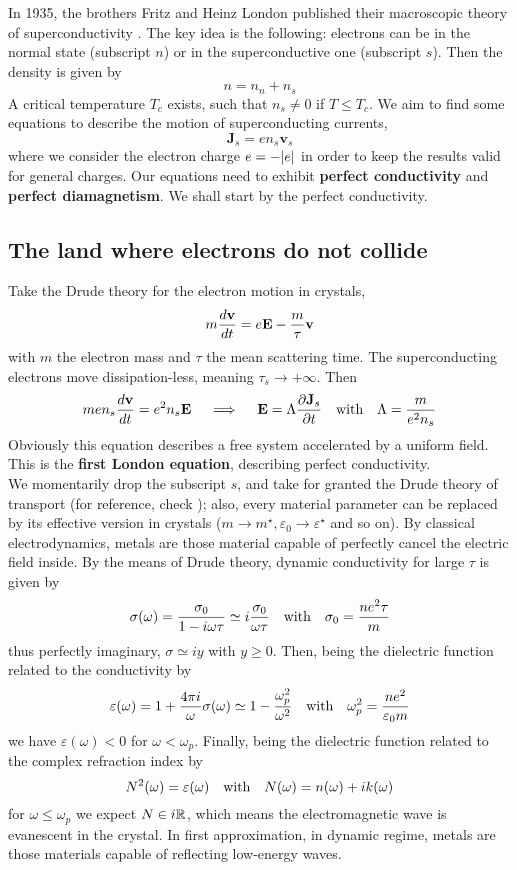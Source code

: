 In 1935, the brothers Fritz and Heinz London published their macroscopic theory of superconductivity \cite{london-superconductivity}. The key idea is the following: electrons can be in the normal state (subscript $n$) or in the superconductive one (subscript $s$). Then the density is given by
\[ n = n_n + n_s \]
A critical temperature $T_c$ exists, such that $n_s \neq 0$ if $T \le T_c$. We aim to find some equations to describe the motion of superconducting currents,
\[ \mathbf{J}_s = e n_s \mathbf{v}_s \]
where we consider the electron charge $e=-\abs{e}$ in order to keep the results valid for general charges. Our equations need to exhibit \textbf{perfect conductivity} and \textbf{perfect diamagnetism}. We shall start by the perfect conductivity.

\subsection{The land where electrons do not collide}

Take the Drude theory for the electron motion in crystals,
\[ m \dv{\mathbf{v}}{t} = e \mathbf{E} - \frac{m}{\tau} \mathbf{v} \]
with $m$ the electron mass and $\tau$ the mean scattering time. The superconducting electrons move dissipation-less, meaning $\tau_s \to +\infty$. Then
\[ m e n_s \dv{\mathbf{v}}{t} = e^2 n_s \mathbf{E} \quad\implies\quad \mathbf{E} = \Lambda \pdv{\mathbf{J}_{s}}{t} \qq{with} \Lambda = \frac{m}{e^2 n_s} \]
Obviously this equation describes a free system accelerated by a uniform field. This is the \textbf{first London equation}, describing perfect conductivity.\\

We momentarily drop the subscript $s$, and take for granted the Drude theory of transport (for reference, check \cite{grosso2000solid}); also, every material parameter can be replaced by its effective version in crystals ($m\to m^\star,\varepsilon_0\to\varepsilon^\star$ and so on). By classical electrodynamics, metals are those material capable of perfectly cancel the electric field inside. By the means of Drude theory, dynamic conductivity for large $\tau$ is given by
\[
    \sigma(\omega) = \frac{\sigma_0}{1 - i \omega\tau} \simeq i \frac{\sigma_0}{\omega\tau} \qq{with} \sigma_0 = \frac{ne^2 \tau}{m}
\]
thus perfectly imaginary, $\sigma \simeq i y$ with $y \ge 0$. Then, being the dielectric function related to the conductivity by
\[ 
    \varepsilon(\omega) = 1 + \frac{4\pi i}{\omega}\sigma(\omega) \simeq 1 - \frac{\omega_p^2}{\omega^2} \qq{with} \omega_p^2 = \frac{n e^2}{\varepsilon_0 m} 
\]
we have $\varepsilon(\omega) <0$ for $\omega < \omega_p$. Finally, being the dielectric function related to the complex refraction index by
\[ 
    N^2(\omega) = \varepsilon(\omega) \qq{with} N(\omega) = n(\omega) + i k(\omega)
\]
for $\omega \le \omega_p$ we expect $N \in i \mathbb{R}$, which means the electromagnetic wave is evanescent in the crystal. In first approximation, in dynamic regime, metals are those materials capable of reflecting low-energy waves.\\

